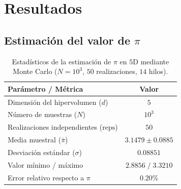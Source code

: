\documentclass[11pt, a4paper]{article}
\begin{document}
\section{Resultados}
\subsection{Estimación del valor de $\pi$}

\begin{table}[htbp]
    \centering
    \caption{Estadísticos de la estimación de $\pi$ en $5\mathrm{D}$ mediante Monte Carlo ($N = 10^3$, $50$ realizaciones, $14$ hilos).}
    \label{tab:mc_resumen_n1000}
    \begin{tabular}{lc}
        \toprule
        \textbf{Parámetro / Métrica} & \textbf{Valor} \\
        \midrule
        Dimensión del hipervolumen ($d$) & $5$ \\
        Número de muestras ($N$) & $10^3$ \\
        Realizaciones independientes ($\text{reps}$) & $50$ \\
        Media muestral ($\bar{\pi}$) & $3.1479 \pm 0.0885$ \\
        Desviación estándar ($\sigma$) & $0.08851$ \\
        Valor mínimo / máximo & $2.8856 \;/\; 3.3210$ \\
        Error relativo respecto a $\pi$ & $0.20\%$ \\
        \bottomrule
    \end{tabular}
\end{table}
\end{document}
